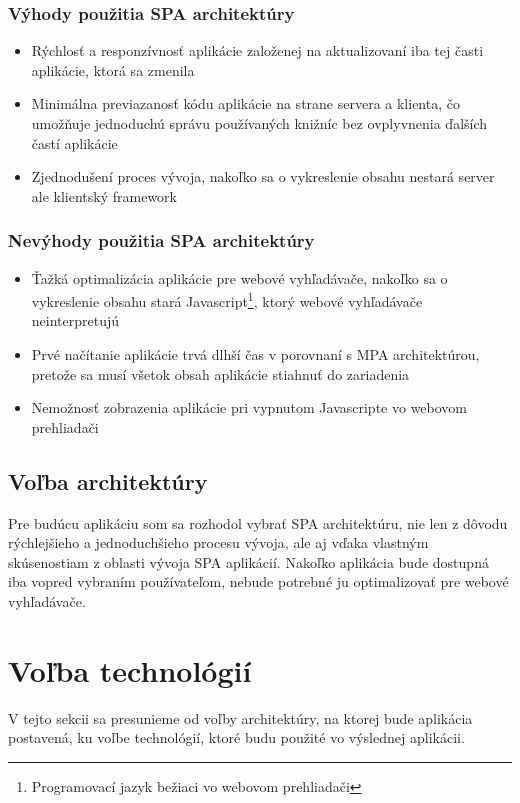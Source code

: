 \subsubsection*{Výhody použitia SPA architektúry}

\begin{itemize}
	\item Rýchlosť a responzívnosť aplikácie založenej na aktualizovaní iba tej časti aplikácie, ktorá sa zmenila \cite{spa-vs-mpa-1}
	\item Minimálna previazanosť kódu aplikácie na strane servera a klienta, čo umožňuje jednoduchú správu používaných knižníc bez ovplyvnenia ďalších častí aplikácie \cite{spa-vs-mpa-2}
	\item Zjednodušení proces vývoja, nakoľko sa o vykreslenie obsahu nestará server ale klientský framework \cite{spa-vs-mpa-3}
\end{itemize}


\subsubsection*{Nevýhody použitia SPA architektúry}

\begin{itemize}
	\item Ťažká optimalizácia aplikácie pre webové vyhľadávače, nakoľko sa o vykreslenie obsahu stará Javascript\footnote{Programovací jazyk bežiaci vo webovom prehliadači}, ktorý webové vyhľadávače neinterpretujú \cite{spa-vs-mpa-1}
	\item Prvé načítanie aplikácie trvá dlhší čas v porovnaní s MPA architektúrou, pretože sa musí všetok obsah aplikácie stiahnuť do zariadenia
	\item Nemožnosť zobrazenia aplikácie pri vypnutom Javascripte vo webovom prehliadači \cite{spa-vs-mpa-2}
\end{itemize}


\subsection{Voľba architektúry}

Pre budúcu aplikáciu som sa rozhodol vybrať SPA architektúru, nie len z dôvodu rýchlejšieho a jednoduchšieho procesu vývoja, ale aj vďaka vlastným skúsenostiam z oblasti vývoja SPA aplikácií. Nakoľko aplikácia bude dostupná iba vopred vybraním používateľom, nebude potrebné ju optimalizovať pre webové vyhľadávače.

\section{Voľba technológií}
V tejto sekcii sa presunieme od voľby architektúry, na ktorej bude aplikácia postavená, ku voľbe technológií, ktoré budu použité vo výslednej aplikácii.

